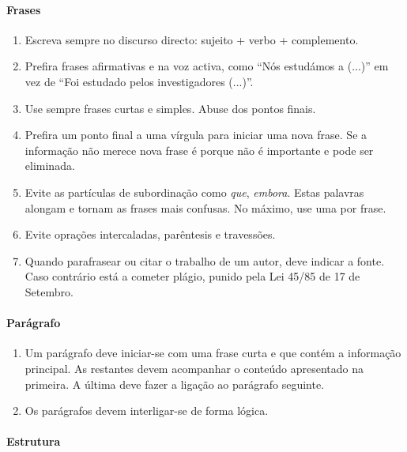\paragraph{Frases}
\begin{enumerate}
\item Escreva sempre no discurso directo: sujeito + verbo + complemento.
\item Prefira frases afirmativas e na voz activa, como ``Nós estudámos a (...)'' em vez de ``Foi estudado pelos investigadores (...)''.
\item Use sempre frases curtas e simples. Abuse dos pontos finais.
\item Prefira um ponto final a uma vírgula para iniciar uma nova frase. Se a informação não merece nova frase é porque não é importante e pode ser eliminada.
\item Evite as partículas de subordinação como \textit{que}, \textit{embora}. Estas palavras alongam e tornam as frases mais confusas. No máximo, use uma por frase.
\item Evite oprações intercaladas, parêntesis e travessões.
\item Quando parafrasear ou citar o trabalho de um autor, deve indicar a fonte. Caso contrário está a cometer plágio, punido pela Lei 45/85 de 17 de Setembro.
\end{enumerate}

\paragraph{Parágrafo}
\begin{enumerate}
\item Um parágrafo  deve iniciar-se com uma frase curta e que contém a informação principal. As restantes devem acompanhar o conteúdo apresentado na primeira. A última deve fazer a ligação ao parágrafo seguinte.
\item Os parágrafos devem interligar-se de forma lógica.
\end{enumerate}

\paragraph{Estrutura}

